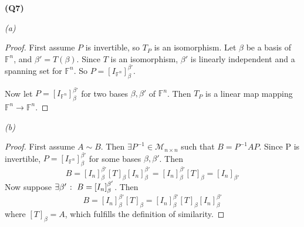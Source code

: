 \documentclass[12pt, a4paper]{article}
\newcommand{\F}{\mathbb{F}}
\begin{document}
\textbf{(Q7)}

\textit{(a)}
\begin{proof}
    First assume $P$ is invertible, so $T_P$ is an isomorphism.
    Let $\beta$ be a basis of $\F^n$, and $\beta' = T(\beta)$.
    Since $T$ is an isomorphism, $\beta'$ is linearly independent
    and a spanning set for $\F^n$.
    So $P = [I_{\F^n}]_\beta^{\beta'}$.

    Now let $P = [I_{\F^n}]_\beta^{\beta'}$ for two bases $\beta, \beta'$
    of $\F^n$. Then $T_P$ is a linear map mapping $\F^n \to \F^n$.

\end{proof}

\textit{(b)}
\begin{proof}
    First assume $A \sim B$. Then $\exists P^{-1} \in \mathcal{M}_{n \times n}$
    such that $B = P^{-1}AP$. Since P is invertible,
    $P = [I_{\F^n}]_\beta^{\beta'}$ for some bases $\beta, \beta'$.
    Then
    \[
        B = [I_n]_{\beta}^{\beta'}[T]_{\beta}[I_n]_\beta^{\beta'}
        = [I_n]_{\beta}^{\beta'}[T]_{\beta}
        = [I_n]_{\beta'}
    \]
    Now suppose $\exists \beta' \; \colon \; B = [I_n]_\beta^{\beta'}$. Then
    \[
        B = [I_n]_{\beta}^{\beta'}[T]_{\beta}
        = [I_n]_{\beta}^{\beta'}[T]_{\beta}[I_n]_\beta^{\beta'}
    \]
    where $[T]_\beta = A$, which fulfills the definition of similarity.
\end{proof}
\end{document}
